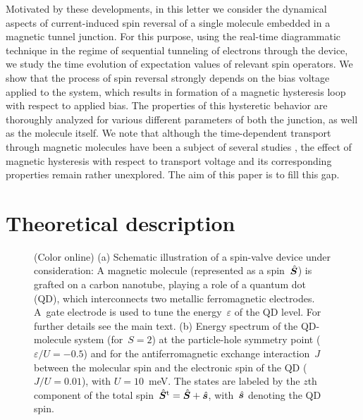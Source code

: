 \documentclass[doublecol]{epl2} %
\newcommand{\e}{\varepsilon}
\newcommand{\vopS}{\skew{3}{\hat}{\bm{S}}}
\newcommand{\vops}{\skew{3}{\hat}{\bm{s}}}
\newcommand{\vopSt}{\skew{3}{\hat}{\bm{S}}^\text{t}}
\begin{document}
Motivated by these developments,
in this letter we consider the dynamical aspects of current-induced
spin reversal of a single molecule embedded in a magnetic tunnel junction.
For this purpose, using the real-time diagrammatic technique
in the regime of sequential tunneling of electrons through the device,
we study the time evolution of expectation values of relevant spin operators.
We show that the process of spin reversal strongly depends on the 
bias voltage applied to the system, which results in 
formation of a magnetic hysteresis loop with respect to applied bias.
The properties of this hysteretic behavior are thoroughly
analyzed for various different parameters of both the junction,
as well as the molecule itself.
%
We note that although the time-dependent transport through magnetic molecules
have been a subject of several studies \cite{Timm2006Jun,Misiorny2009Jun,Fransson2009Jun,Loth2010,
Lu2009May,Hammar2016Aug,Plominska2017Apr,Plominska2018Jan},
the effect of magnetic hysteresis with respect to transport voltage
and its corresponding properties remain rather unexplored.
The aim of this paper is to fill this gap.

\section{Theoretical description}
%
\begin{figure}[t!]
  	\caption{
  	(Color online)
  	(a) Schematic illustration of a spin-valve device under consideration: A magnetic molecule (represented as a spin~$\vopS$) is grafted on a carbon nanotube, playing a role of a quantum dot (QD), which interconnects two metallic ferromagnetic electrodes.
  	A~gate electrode is used to tune the energy~$\e$ of the QD level.
  	For further details see the main text.
  	(b) Energy spectrum of the QD-molecule system (for~\mbox{$S=2$}) at the particle-hole symmetry point (\mbox{$\e/U=-0.5$}) and for the antiferromagnetic exchange interaction~$J$ between the molecular spin and the electronic spin of the QD (\mbox{$J/U=0.01$}), with \mbox{$U=10$~meV}.
  	The states are labeled by the $z$th component of the total spin~\mbox{$\vopSt=\vopS+\vops$}, with~$\vops$ denoting the QD spin.
    \label{fig1}
  	}
\end{figure}
%
\end{document}
